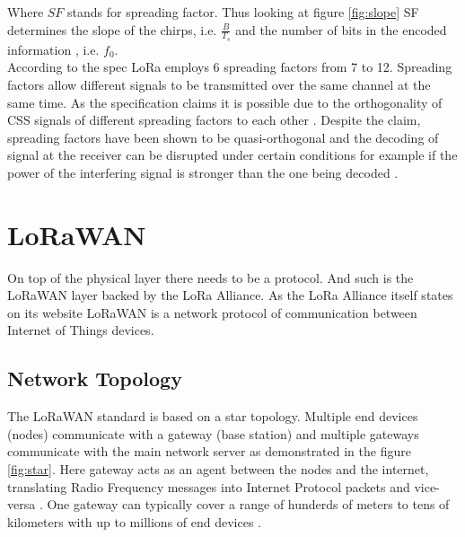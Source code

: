 Where $SF$ stands for spreading factor. Thus looking at figure \ref{fig:slope} SF determines the slope of the chirps, i.e. $\frac{B}{T_s}$ and the number of bits in the encoded information \cite{sf_article}, i.e. $f_0$.\\

According to the spec \cite{semtech_spec} LoRa employs 6 spreading factors from 7 to 12. Spreading factors allow different signals to be transmitted over the same channel at the same time. As the specification claims it is possible due to the orthogonality of CSS signals of different spreading factors to each other \cite{semtech_spec}.
Despite the claim, spreading factors have been shown to be quasi-orthogonal and the decoding of signal at the receiver can be disrupted under certain conditions for example if the power of the interfering signal is stronger than the one being decoded \cite{imperfect_1}.

\section{LoRaWAN}

On top of the physical layer there needs to be a protocol. And such is the LoRaWAN layer backed by the LoRa Alliance. As the LoRa Alliance itself states on its website \cite{lora_alliance_about_lorawan} LoRaWAN is a network protocol of communication between Internet of Things devices.

\subsection{Network Topology}

The LoRaWAN standard is based on a star topology.
Multiple end devices (nodes) communicate with a gateway (base station) and multiple gateways communicate with the main network server as demonstrated in the figure \ref{fig:star}. Here gateway acts as an agent between the nodes and the internet, translating Radio Frequency messages into Internet Protocol packets and vice-versa \cite{lora_alliance_about_lorawan}.
One gateway can typically cover a range of hunderds of meters to tens of kilometers with up to millions of end devices \cite{doppler}.

